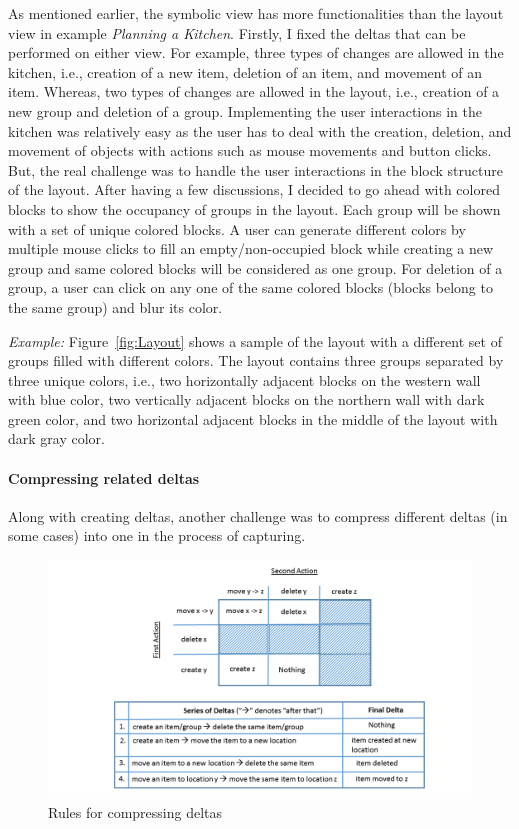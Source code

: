 As mentioned earlier, the symbolic view has more functionalities than the layout view in example \textit{Planning a Kitchen}. Firstly, I fixed the deltas that can be performed on either view. For example, three types of changes are allowed in the kitchen, i.e., creation of a new item, deletion of an item, and movement of an item. Whereas, two types of changes are allowed in the layout, i.e., creation of a new group and deletion of a group. Implementing the user interactions in the kitchen was relatively easy as the user has to deal with the creation, deletion, and movement of objects with actions such as mouse movements and button clicks. But, the real challenge was to handle the user interactions in the block structure of the layout. After having a few discussions, I decided to go ahead with colored blocks to show the occupancy of groups in the layout. Each group will be shown with a set of unique colored blocks. A user can generate different colors by multiple mouse clicks to fill an empty/non-occupied block while creating a new group and same colored blocks will be considered as one group. For deletion of a group, a user can click on any one of the same colored blocks (blocks belong to the same group) and blur its color. 

\textit{Example:} Figure~\ref{fig:Layout} shows a sample of the layout with a different set of groups filled with different colors. The layout contains three groups separated by three unique colors, i.e., two horizontally adjacent blocks on the western wall with {\color{blue} blue} color, two vertically adjacent blocks on the northern wall with {\color{darkgreen} dark green} color, and two horizontal adjacent blocks in the middle of the layout with {\color{darkgray} dark gray} color.

\paragraph{Compressing related deltas}
Along with creating deltas, another challenge was to compress different deltas (in some cases) into one in the process of capturing. 

\begin{figure}[h]
	\centering
	\includegraphics[width=1\textwidth]{figures/seriesofdeltas}
	\caption{Rules for compressing deltas}
	\label{fig:seriesofdeltas}
\end{figure}

